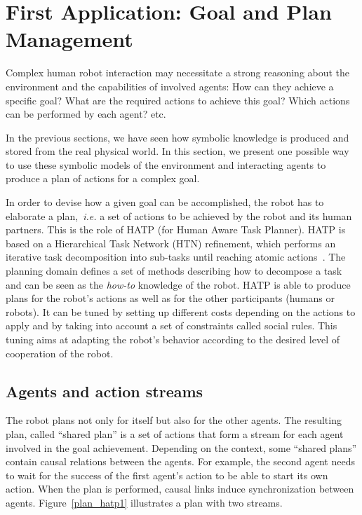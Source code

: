 \documentclass{svmult}
\begin{document}

\section{First Application: Goal and Plan Management}
\label{sec|hatp}

Complex human robot interaction may necessitate a strong reasoning about
the environment and the capabilities of involved agents: How can they
achieve a specific goal? What are the required actions to achieve this
goal? Which actions can be performed by each agent? etc.

In the previous sections, we have seen how symbolic knowledge is produced
and stored from the real physical world. In this section, we present one
possible way to use these symbolic models of the environment and
interacting agents to produce a plan of actions for a complex
goal.

In order to devise how a given goal can be accomplished, the robot has
to elaborate a plan,~\textit{i.e.} a set of actions to be achieved by
the robot and its human partners.  This is the role of HATP
\cite{Alili2008} (for Human Aware Task Planner).  HATP is based on a
Hierarchical Task Network (HTN) refinement, which performs an iterative
task decomposition into sub-tasks until reaching atomic
actions~\cite{Nau2003}.  The planning domain defines a set of methods
describing how to decompose a task and can be seen as the {\it how-to}
knowledge of the robot.  HATP is able to produce plans for the robot's
actions as well as for the other participants (humans or robots). It
can be tuned by setting up different costs depending on the actions to
apply and by taking into account a set of constraints called social
rules. This tuning aims at adapting the robot's behavior according to
the desired level of cooperation of the robot.

\subsection*{Agents and action streams}

The robot plans not only for itself but also for the other agents. The
resulting plan, called ``shared plan'' is a set of actions that form
a stream for each agent involved in the goal achievement. Depending on
the context, some ``shared plans'' contain causal relations between the
agents. For example, the second agent needs to wait for the success of
the first agent's action to be able to start its own action. When the
plan is performed, causal links induce synchronization between
agents. Figure~\ref{plan_hatp1} illustrates a plan with two streams.
\end{document}
